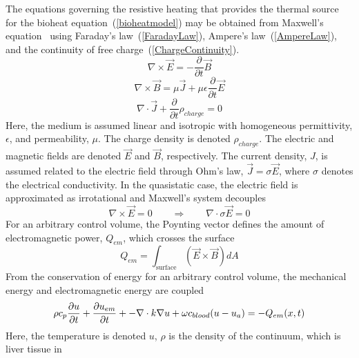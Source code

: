 \documentclass{article}
\newcommand{\eqn}[1]{(\ref{#1})}
\newcommand{\picdir}{pdffig}
\begin{document}
The equations governing the resistive heating that provides the thermal
source for the bioheat equation~\eqn{bioheatmodel} may be obtained from
Maxwell's equation~\cite{demkowicz2006cha} using Faraday's
law~\eqn{FaradayLaw}, Ampere's law~\eqn{AmpereLaw}, and the continuity
of free charge~\eqn{ChargeContinuity}.
\begin{equation} \label{FaradayLaw}
 \nabla \times \vec{E} = -\frac{\partial}{\partial t} \vec{B}
\end{equation}
\begin{equation} \label{AmpereLaw}
 \nabla \times \vec{B} = 
        \mu \vec{J} + \mu \epsilon \frac{\partial}{\partial t} \vec{E}
\end{equation}
\begin{equation} \label{ChargeContinuity}
    \nabla \cdot \vec{J} + \frac{\partial}{\partial t} \rho_{charge} = 0 
\end{equation}
Here, the medium is assumed linear and isotropic with homogeneous
permittivity, $\epsilon$, and permeability, $\mu$.
The charge density is denoted $\rho_{charge}$.
The electric and magnetic fields are denoted
$\vec{E}$ and $\vec{B}$, respectively. 
The current density, $J$, is assumed related to the electric field
through Ohm's law, $\vec{J}=\sigma \vec{E}$, where $\sigma$ denotes
the electrical conductivity.
In the quasistatic case, the electric field is approximated as
irrotational and Maxwell's system decouples
\[ 
 \nabla \times \vec{E}   = 0 
 \qquad \Rightarrow \qquad
 \nabla \cdot \sigma \vec{E}   = 0 
\]
For an arbitrary control volume, the Poynting vector defines the amount
of electromagnetic power, $Q_{em}$, which crosses the surface
\[
 Q_{em} = \int_{\text{surface}} 
                \left( \vec{E} \times \vec{B} \right) dA
\]
From the conservation of energy for an arbitrary control volume, the
mechanical energy and electromagnetic energy are coupled~\cite{pao1967fd}
\[
 \rho  c_p \frac{\partial u}{\partial t} + 
           \frac{\partial u_{em}}{\partial t} + 
  -\nabla  \cdot k \nabla u + \omega c_{blood} (u - u_a )
 = -Q_{em}(x,t) \\
\]
Here, the temperature is denoted $u$,
$\rho$  is the density of the continuum, which is liver tissue in
\end{document}
